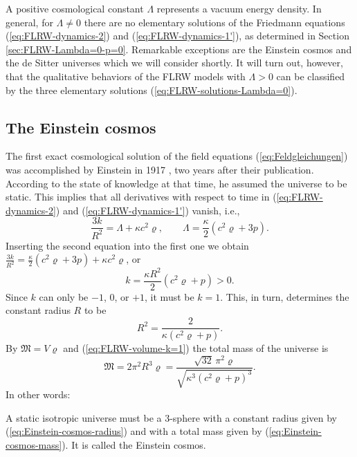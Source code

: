 A positive cosmological constant $\Lambda$ represents a vacuum energy density.
In general, for $\Lambda \ne 0$ there are no elementary solutions of the Friedmann equations (\ref{eq:FLRW-dynamics-2}) and (\ref{eq:FLRW-dynamics-1'}), as determined in Section \ref{sec:FLRW-Lambda=0-p=0}.
Remarkable exceptions are the Einstein cosmos and the de Sitter universes which we will consider shortly.
It will turn out, however, that the qualitative behaviors of the FLRW models with $\Lambda > 0$ can be classified by the three elementary solutions (\ref{eq:FLRW-solutions-Lambda=0}).


\subsection{The Einstein cosmos}
The first exact cosmological solution of the field equations (\ref{eq:Feldgleichungen}) was accomplished by Einstein in 1917 \cite{Einstein-1917}, 
two years after their publication. According to the state of knowledge at that time, he assumed the universe to be static. This implies that all derivatives with respect to time in (\ref{eq:FLRW-dynamics-2}) and (\ref{eq:FLRW-dynamics-1'}) vanish, i.e.,
\begin{equation}
	\frac{3k}{R^2}
	= \Lambda + \kappa c^2 \varrho
	,
	\qquad
	\Lambda
	= \frac{\kappa}{2} \left(c^2 \varrho + 3p\right)
	.
\end{equation}
Inserting the second equation into the first one we obtain
$\frac{3k}{R^2} = \frac{\kappa}{2} \left(c^2 \varrho + 3p\right) + \kappa c^2 \varrho$,
or
\begin{equation}
	k
	= \frac{\kappa R^2}{2} \left( c^2 \varrho + p \right)
	> 0
	.
\end{equation}
Since $k$ can only be $-1$, $0$, or $+1$, it must be $k=1$.
This, in turn, determines the constant radius $R$ to be
\begin{equation}
	R^2 = \frac{2}{\kappa (c^2 \varrho + p)}.
	\label{eq:Einstein-cosmos-radius}
\end{equation}
By $\mathfrak{M} = V \varrho$ and (\ref{eq:FLRW-volume-k=1}) the total mass of the universe is
\begin{equation}
	\mathfrak{M} 
	= 2 \pi^2 R^3 \varrho
	= \frac{\sqrt{32} \, \pi^2 \varrho}{\sqrt{\kappa^3 (c^2 \varrho + p)^3}}
	.
	\label{eq:Einstein-cosmos-mass}
\end{equation}
In other words:
\begin{satz}
	A static isotropic universe must be a 3-sphere with a constant radius given by (\ref{eq:Einstein-cosmos-radius}) and with a total mass given by (\ref{eq:Einstein-cosmos-mass}).
	It is called the Einstein cosmos.
\end{satz}

